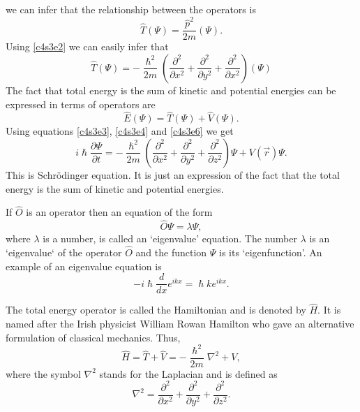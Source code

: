 we can infer that the relationship between the operators is
\begin{equation}\label{c4s3e5}
\hat{T}(\Psi) = \frac{\hat{p}^2}{2m}(\Psi).
\end{equation}
Using \eqref{c4s3e2} we can easily infer that
\begin{equation}\label{c4s3e6}
\hat{T}(\Psi) = -\frac{\hslash^2}{2m}\left(\frac{\partial^2}{\partial x^2} 
+ \frac{\partial^2}{\partial y^2} + \frac{\partial^2}{\partial x^2}\right)
(\Psi)
\end{equation}
The fact that total energy is the sum of kinetic and potential energies can be
expressed in terms of operators are
\begin{equation}\label{c4s3e7}
\hat{E}(\Psi) = \hat{T}(\Psi) + \hat{V}(\Psi).
\end{equation}
Using equations \eqref{c4s3e3}, \eqref{c4s3e4} and \eqref{c4s3e6} we get
\begin{equation}\label{c4s3e8}
i\hslash\frac{\partial\Psi}{\partial t} = -\frac{\hslash^2}{2m}
\left(\frac{\partial^2}{\partial x^2} + \frac{\partial^2}{\partial y^2} +
 \frac{\partial^2}{\partial z^2}\right)\Psi + V(\vec{r})\Psi.
\end{equation} 
This is Schr\"{o}dinger equation. It is just an expression of the fact that the
total energy is the sum of kinetic and potential energies.

If $\hat{O}$ is an operator then an equation of the form
\begin{equation}\label{c4s3e9}
\hat{O}\Psi = \lambda\Psi,
\end{equation}
where $\lambda$ is a number, is called an `eigenvalue' equation. The number 
$\lambda$ is an `eigenvalue` of the operator $\hat{O}$ and the function $\Psi$
is its `eigenfunction'. An example of an eigenvalue equation is
\begin{equation}\label{c4s3e10}
-i\hslash \frac{d}{dx} e^{ikx} = \hslash k e^{ikx}.
\end{equation}

The total energy operator is called the Hamiltonian and is denoted by $\hat{H}$.
It is named after the Irish physicist William Rowan Hamilton who gave an 
alternative formulation of classical mechanics. Thus,
\begin{equation}\label{c4s3e11}
\hat{H} = \hat{T} + \hat{V} = -\frac{\hslash^2}{2m}\nabla^2 + V,
\end{equation}
where the symbol $\nabla^2$ stands for the Laplacian and is defined as
\begin{equation}\label{c4s3e12}
\nabla^2 = \frac{\partial^2}{\partial x^2} + 
\frac{\partial^2}{\partial y^2} +  \frac{\partial^2}{\partial z^2}.
\end{equation}

